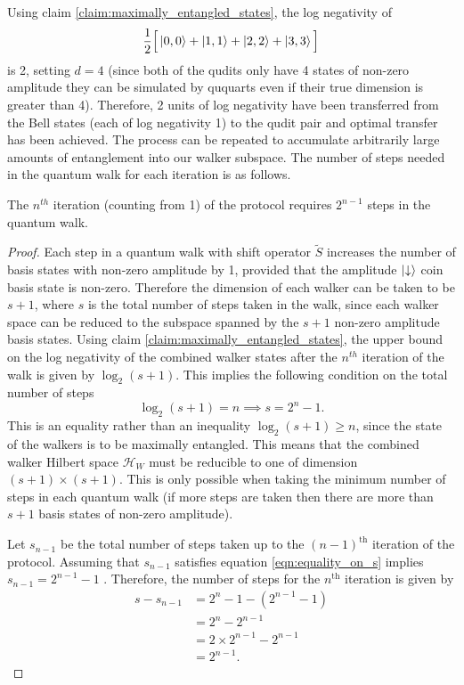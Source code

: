 Using claim \ref{claim:maximally_entangled_states}, the log negativity of
\begin{equation}
    \frac{1}{2}\Big[\ket{0,0} + \ket{1,1} + \ket{2,2} + \ket{3,3}\Big ]
\end{equation}
is 2, setting $d=4$ (since both of the qudits only have 4 states of non-zero amplitude they can be simulated by ququarts even if their true dimension is greater than 4).
Therefore, 2 units of log negativity have been transferred from the Bell states (each of log negativity 1) to the qudit pair and optimal transfer has been achieved.
The process can be repeated to accumulate arbitrarily large amounts of entanglement into our walker subspace.
The number of steps needed in the quantum walk for each iteration is as follows.
\begin{claim}
\label{claim:min_steps}
The $n^{th}$ iteration (counting from 1) of the protocol requires $2^{n-1}$ steps in the quantum walk.
\end{claim}
\begin{proof}
Each step in a quantum walk with shift operator $\tilde{S}$ increases the number of basis states with non-zero amplitude by 1, provided that the amplitude $\ket{\downarrow}$ coin basis state is non-zero.
Therefore the dimension of each walker can be taken to be $s + 1$, where $s$ is the total number of steps taken in the walk, since each walker space can be reduced to the subspace spanned by the $s+1$ non-zero amplitude basis states.
Using claim \ref{claim:maximally_entangled_states}, the upper bound on the log negativity of the combined walker states after the $n^{th}$ iteration of the walk is given by $\log_2(s+1)$.
This implies the following condition on the total number of steps
\begin{equation}
    \log_2(s+1) = n \implies s = 2^n -1.
    \label{eqn:equality_on_s}
\end{equation}
This is an equality rather than an inequality $\log_2(s+1) \geq n$, since the state of the walkers is to be maximally entangled.
This means that the combined walker Hilbert space $\mathcal{H}_W$ must be reducible to one of dimension $(s+1) \times (s+1)$.
This is only possible when taking the minimum number of steps in each quantum walk (if more steps are taken then there are more than $s+1$ basis states of non-zero amplitude).

Let $s_{n-1}$ be the total number of steps taken up to the $(n-1)^\text{th}$ iteration of the protocol.
Assuming that $s_{n-1}$ satisfies equation \ref{eqn:equality_on_s} implies $s_{n-1} = 2^{n-1} -1$ .
Therefore, the number of steps for the $n^{\text{th}}$ iteration is given by
\begin{align}
    s - s_{n-1} &= 2^{n} - 1 - (2^{n-1} -1)\\
    &= 2^n - 2^{n-1}\\
    &= 2 \times 2^{n-1} - 2^{n-1}\\
    &= 2^{n-1}.
\end{align}
\end{proof}

